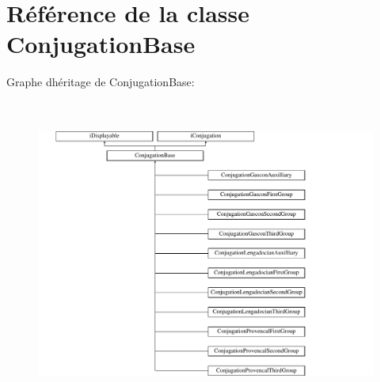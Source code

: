 \hypertarget{classConjugationBase}{}\section{Référence de la classe Conjugation\+Base}
\label{classConjugationBase}
Graphe d\textquotesingle{}héritage de Conjugation\+Base\+:\begin{figure}[H]
\begin{center}
\leavevmode
\includegraphics[height=10.196078cm]{classConjugationBase}
\end{center}
\end{figure}
